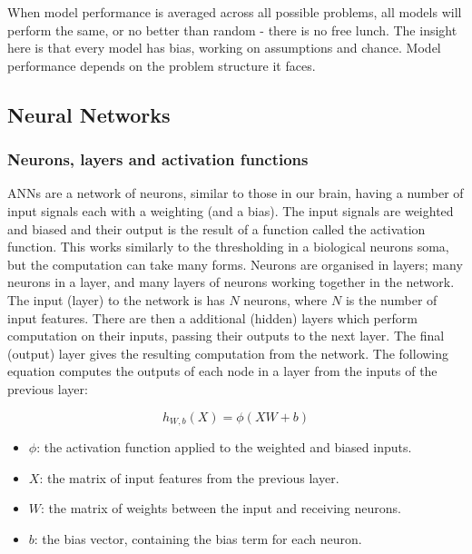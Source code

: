 \documentclass[11pt]{article}
\begin{document}
When model performance is averaged across all possible problems, all models will perform the same, or no better than random - there is no free lunch. The insight here is that every model has bias, working on assumptions and chance. Model performance depends on the problem structure it faces.


\subsection{Neural Networks}
\label{anns}

\subsubsection{Neurons, layers and activation functions}

ANNs are a network of neurons, similar to those in our brain, having a number of input signals each with a weighting (and a bias). The input signals are weighted and biased and their output is the result of a function called the activation function. This works similarly to the thresholding in a biological neurons soma, but the computation can take many forms. Neurons are organised in layers; many neurons in a layer, and many layers of neurons working together in the network. The input (layer) to the network is has $N$ neurons, where $N$ is the number of input features. There are then a additional (hidden) layers which perform computation on their inputs, passing their outputs to the next layer. The final (output) layer gives the resulting computation from the network. The following equation computes the outputs of each node in a layer from the inputs of the previous layer:

\[ h_{W,b}(X)=\phi(XW+b) \]

\begin{itemize}
\setlength\itemsep{0em}
\item $\phi$: the activation function applied to the weighted and biased inputs.
\item $X$: the matrix of input features from the previous layer.
\item $W$: the matrix of weights between the input and receiving neurons.
\item $b$: the bias vector, containing the bias term for each neuron.
\end{itemize}
\end{document}
